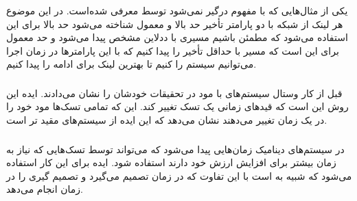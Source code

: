 \documentclass[a4paper, 11pt]{article}
\begin{document}
\subsubsection{}
یکی از مثال‌هایی که با مفهوم
درگیر نمی‌شود توسط
معرفی شده‌است. در این موضوع هر لینک از شبکه با دو پارامتر تأخیر حد بالا و معمول شناخته می‌شود
حد بالا برای این استفاده می‌شود که مطمئن باشیم مسیری با ددلاین مشخص پیدا می‌شود و حد معمول
برای این است که مسیر با حداقل تأخیر را پیدا کنیم که با این پارامتر‌ها در زمان اجرا می‌توانیم سیستم را
کنیم تا بهترین لینک برای ادامه را پیدا کنیم.
\subsubsection{}
قبل از کار وستال سیستم‌های با مود در تحقیقات خودشان را نشان می‌دادند. ایده این روش این است که
قید‌های زمانی یک تسک تغییر کند. این که تمامی تسک‌ها مود خود را در یک زمان تغییر می‌دهند
نشان می‌دهد که این ایده از سیستم‌های
مقید تر است.
\subsubsection{}
در سیستم‌های دینامیک زمان‌هایی پیدا می‌شود که می‌تواند توسط تسک‌هایی که نیاز به زمان بیشتر
برای افزایش ارزش خود دارند استفاده شود. ایده
برای این کار استفاده می‌شود که شبیه به
است با این تفاوت که
در زمان
تصمیم می‌گیرد و
تصمیم گیری را در زمان
انجام می‌دهد.
\end{document}
